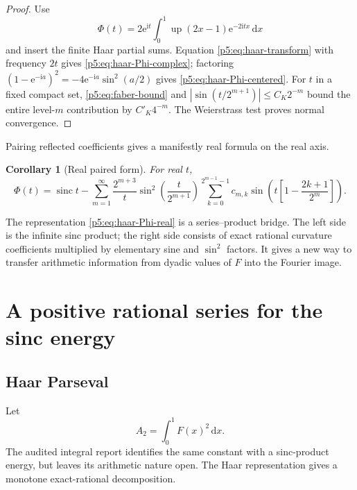 \documentclass[11pt,oneside]{article}
\newtheorem{corollary}[theorem]{Corollary}
\theoremstyle{definition}
\newcommand{\dd}{\,\mathrm d}
\newcommand{\e}{\mathrm e}
\newcommand{\ii}{\mathrm i}
\newcommand{\Up}{\operatorname{up}}
\newcommand{\sinc}{\operatorname{sinc}}
\begin{document}
\begin{proof}
Use
\[
 \Phi(t)=2\e^{\ii t}\int_0^1\Up(2x-1)\e^{-2\ii tx}\dd x
\]
and insert the finite Haar partial sums.  Equation
\eqref{p5:eq:haar-transform} with frequency $2t$ gives
\eqref{p5:eq:haar-Phi-complex}; factoring
$(1-\e^{-\ii a})^2=-4\e^{-\ii a}\sin^2(a/2)$ gives
\eqref{p5:eq:haar-Phi-centered}.  For $t$ in a fixed compact set,
\eqref{p5:eq:faber-bound} and
$|\sin(t/2^{m+1})|\le C_K2^{-m}$ bound the entire level-$m$ contribution by
$C'_K4^{-m}$.  The Weierstrass test proves normal convergence.
\end{proof}

Pairing reflected coefficients gives a manifestly real formula on the real
axis.

\begin{corollary}[Real paired form]
\label{p5:cor:haar-Phi-real}
For real $t$,
\begin{equation}
 \boxed{\displaystyle
 \Phi(t)=\sinc t-
 \sum_{m=1}^\infty\frac{2^{m+3}}{t}
 \sin^2\!\left(\frac{t}{2^{m+1}}\right)
 \sum_{k=0}^{2^{m-1}-1}c_{m,k}
 \sin\!\left(t\left[1-\frac{2k+1}{2^m}\right]\right).} \label{p5:eq:haar-Phi-real}
\end{equation}
\end{corollary}

The representation \eqref{p5:eq:haar-Phi-real} is a series--product bridge.  The
left side is the infinite sinc product; the right side consists of exact
rational curvature coefficients multiplied by elementary sine and
$\sin^2$ factors.  It gives a new way to transfer arithmetic information from
dyadic values of $F$ into the Fourier image.

\section{A positive rational series for the sinc energy}
\label{p5:sec:energy}

\subsection{Haar Parseval}

Let
\begin{equation}
 A_2=\int_0^1F(x)^2\dd x.                                \label{p5:eq:A2-definition}
\end{equation}
The audited integral report identifies the same constant with a sinc-product
energy, but leaves its arithmetic nature open.  The Haar representation gives
a monotone exact-rational decomposition.
\end{document}
